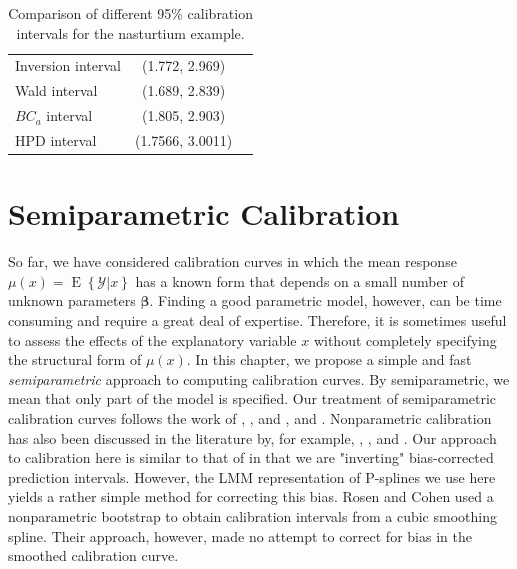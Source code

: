 \documentclass[cmfont,usenames,dvipsnames,leqno]{afit-etd}\usepackage[]{graphicx}\usepackage[]{color}
\newcommand{\mc}[1]{\ensuremath{\mathcal{#1}}}
\newcommand{\E}{\operatorname{E}}
\begin{document}
\begin{table}
  \begin{center}
     \begin{tabular}{lcc}
       \toprule
       Inversion interval & (1.772, 2.969) \\ 
       Wald interval      & (1.689, 2.839) \\ 
       $BC_a$ interval    & (1.805, 2.903) \\ 
       HPD interval       & (1.7566, 3.0011) \\ 
       \bottomrule
     \end{tabular}
   \end{center}
   \caption[ 95\% calibration intervals for the nasturtium data]{Comparison of different 95\% calibration intervals for the nasturtium example. \label{tab:results}}
 \end{table}





\chapter{Semiparametric Calibration}
\label{chap:nonparametric}
So far, we have considered calibration curves in which the mean response $\mu(x) = \E\left\{\mc{Y} | x\right\}$ has a known form that depends on a small number of unknown parameters $\bm{\beta}$. Finding a good parametric model, however, can be time consuming and require a great deal of expertise. Therefore, it is sometimes useful to assess the effects of the explanatory variable $x$ without completely specifying the structural form of $\mu(x)$. In this chapter, we propose a simple and fast \textit{semiparametric} approach to computing calibration curves. By semiparametric, we mean that only part of the model is specified. Our treatment of semiparametric calibration curves follows the work of \citet{brumback_comment_1999}, \citet{ruppert_selecting_2002}, and \citet{ruppert_semiparametric_2003}, and \citet{crainiceanu_bayesian_2005}. Nonparametric calibration has also been discussed in the literature by, for example, \citet{clark_calibration_1979}, \citet{clark_calibration_1980}, and \citet{rosen_constructing_1995}. Our approach to calibration here is similar to that of \citet{clark_calibration_1980} in that we are "inverting" bias-corrected prediction intervals. However, the \ac{LMM} representation of \ac{P-spline}s \citep{ruppert_semiparametric_2003} we use here yields a rather simple method for correcting this bias. Rosen and Cohen used a nonparametric bootstrap to obtain calibration intervals from a cubic smoothing spline. Their approach, however, made no attempt to correct for bias in the smoothed calibration curve.
\end{document}
